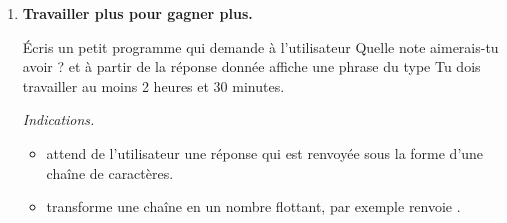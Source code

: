 \documentclass[11pt,class=report,crop=false]{standalone}
\begin{document}
\begin{activite}
\begin{enumerate}
	
	\item \textbf{Travailler plus pour gagner plus.}
	
	\'Ecris un petit programme qui demande à l'utilisateur \og{}Quelle note aimerais-tu avoir ?\fg{}
	et à partir de la réponse donnée affiche une phrase du type \og{}Tu dois travailler au moins 2 heures et 30 minutes.\fg{} 
	
	\emph{Indications.} 
	\begin{itemize}
		\item {} attend de l'utilisateur une réponse qui est renvoyée sous la forme d'une chaîne de caractères. 
		\item {} transforme une chaîne en un nombre flottant, par exemple 
		 renvoie .
	\end{itemize}
\end{enumerate}
	
\end{activite}




\end{document}
